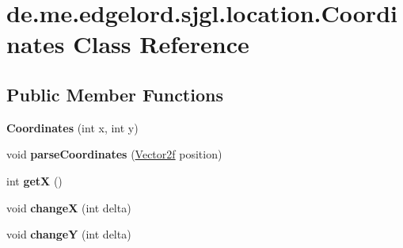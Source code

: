 \hypertarget{classde_1_1me_1_1edgelord_1_1sjgl_1_1location_1_1_coordinates}{}\section{de.\+me.\+edgelord.\+sjgl.\+location.\+Coordinates Class Reference}
\label{classde_1_1me_1_1edgelord_1_1sjgl_1_1location_1_1_coordinates}
\subsection*{Public Member Functions}
\begin{DoxyCompactItemize}
\item 
\mbox{\label{classde_1_1me_1_1edgelord_1_1sjgl_1_1location_1_1_coordinates_a9d742eadf80a1b4d369611b0119d0825}} 
{\bfseries Coordinates} (int x, int y)
\item 
\mbox{\label{classde_1_1me_1_1edgelord_1_1sjgl_1_1location_1_1_coordinates_a9cdb6f0263e2d1d5716627258a695ddc}} 
void {\bfseries parse\+Coordinates} (\mbox{\hyperlink{classde_1_1me_1_1edgelord_1_1sjgl_1_1location_1_1_vector2f}{Vector2f}} position)
\item 
\mbox{\label{classde_1_1me_1_1edgelord_1_1sjgl_1_1location_1_1_coordinates_a81aeac4328243853bdd6be1f3d6fb53f}} 
int {\bfseries getX} ()
\item 
\mbox{\label{classde_1_1me_1_1edgelord_1_1sjgl_1_1location_1_1_coordinates_a2ccf5cf0dfb31d8bdfa52dfd96897a70}} 
void {\bfseries changeX} (int delta)
\item 
\mbox{\label{classde_1_1me_1_1edgelord_1_1sjgl_1_1location_1_1_coordinates_a0baf0c9e39e61f2e6833d8d3efb855d2}} 
void {\bfseries changeY} (int delta)
\item 
\mbox{\label{classde_1_1me_1_1edgelord_1_1sjgl_1_1location_1_1_coordinates_a4d4761ee455dd47745c7be63deabf45a}} 

\end{DoxyCompactItemize}
